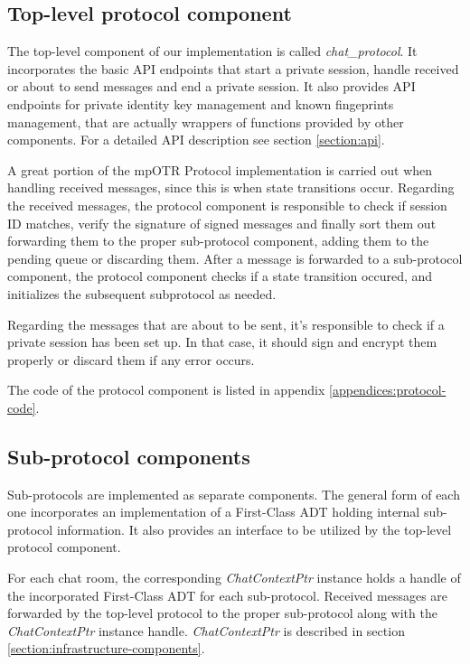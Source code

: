 \subsection{Top-level protocol component}
The top-level component of our implementation is called \emph{chat\_protocol}. It incorporates the basic API endpoints that start a private session, handle received or about to send messages and end a private session. It also provides API endpoints for private identity key management and known fingeprints management, that are actually wrappers of functions provided by other components. For a detailed API description see section \ref{section:api}.

A great portion of the mpOTR Protocol implementation is carried out when handling received messages, since this is when state transitions occur. Regarding the received messages, the protocol component is responsible to check if session ID matches, verify the signature of signed messages and finally sort them out forwarding them to the proper sub-protocol component, adding them to the pending queue or discarding them. After a message is forwarded to a sub-protocol component, the protocol component checks if a state transition occured, and initializes the subsequent subprotocol as needed.

Regarding the messages that are about to be sent, it's responsible to check if a private session has been set up. In that case, it should sign and encrypt them properly or discard them if any error occurs.

The code of the protocol component is listed in appendix \ref{appendices:protocol-code}.

\subsection{Sub-protocol components}
Sub-protocols are implemented as separate components. The general form of each one incorporates an implementation of a First-Class ADT holding internal sub-protocol information. It also provides an interface to be utilized by the top-level protocol component.

For each chat room, the corresponding \emph{ChatContextPtr} instance holds a handle of the incorporated First-Class ADT for each sub-protocol. Received messages are forwarded by the top-level protocol to the proper sub-protocol along with the \emph{ChatContextPtr} instance handle. \emph{ChatContextPtr} is described in section \ref{section:infrastructure-components}.

